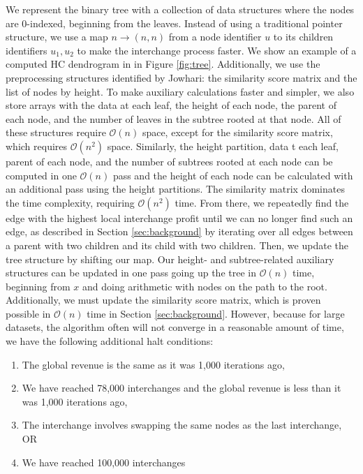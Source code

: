 \documentclass[unnumsec,webpdf,contemporary,large,numbered]{oup-authoring-template}%
\theoremstyle{thmstyleone}%
\theoremstyle{thmstyletwo}%
\theoremstyle{thmstylethree}%
\begin{document}
We represent the binary tree with a collection of data structures where the nodes are 0-indexed, beginning from the leaves. Instead of using a traditional pointer structure, we use a map $n \rightarrow (n, n)$ from a node identifier $u$ to its children identifiers $u_1, u_2$ to make the interchange process faster. We show an example of a computed HC dendrogram in in Figure \ref{fig:tree}. Additionally, we use the preprocessing structures identified by Jowhari: the similarity score matrix and the list of nodes by height. To make auxiliary calculations faster and simpler, we also store arrays with the data at each leaf, the height of each node, the parent of each node, and the number of leaves in the subtree rooted at that node. All of these structures require $\mathcal{O}(n)$ space, except for the similarity score matrix, which requires $\mathcal{O}(n^2)$ space. Similarly, the height partition, data t each leaf, parent of each node, and the number of subtrees rooted at each node can be computed in one $\mathcal{O}(n)$ pass and the height of each node can be calculated with an additional pass using the height partitions. The similarity matrix dominates the time complexity, requiring $\mathcal{O}(n^2)$ time.
From there, we repeatedly find the edge with the highest local interchange profit until we can no longer find such an edge, as described in Section \ref{sec:background} by iterating over all edges between a parent with two children and its child with two children. Then, we update the tree structure by shifting our map. Our height- and subtree-related auxiliary structures can be updated in one pass going up the tree in $\mathcal{O}(n)$ time, beginning from $x$ and doing arithmetic with nodes on the path to the root. Additionally, we must update the similarity score matrix, which is proven possible in $\mathcal{O}(n)$ time in Section \ref{sec:background}. However, because for large datasets, the algorithm often will not converge in a reasonable amount of time, we have the following additional halt conditions:
\begin{enumerate}
    \item The global revenue is the same as it was 1,000 iterations ago,
    \item We have reached 78,000 interchanges and the global revenue is less than it was 1,000 iterations ago,
    \item The interchange involves swapping the same nodes as the last interchange, OR
    \item We have reached 100,000 interchanges
\end{enumerate}
\end{document}
